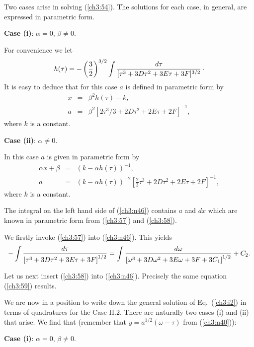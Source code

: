 Two cases arise in solving (\ref{ch3:54}). The solutions for each case, in general,
are expressed in parametric form.

{\bf Case (i)}: $\alpha=0$, $\beta\ne0$.

For convenience we let
\begin{equation}
h(\tau)=-\left({3\over2}\right)^{3/2}\int {d\tau\over[\tau^3+3D\tau^2+3E\tau+3F]^{3/2}}\,\cdot\label{ch3:56}
\end{equation}
It is easy to deduce that for this case $a$ is defined in parametric form by
\begin{equation} \label{ch3:57} 
\begin{array}{lll} x &=&
\beta^2h(\tau)-k,\\ 
a &=& \beta^2[2\tau^3/3+2D\tau^2+2E\tau+2F]^{-1}, 
\end{array} 
\end{equation}
where $k$ is  a constant. 

{\bf Case (ii)}: $\alpha\ne0$.

In this case $a$ is given in parametric form by
\begin{equation}\label{ch3:58}
\begin{array}{lll} \alpha x+\beta &= & (k-\alpha h(\tau))^{-1},\\
a&=&(k-\alpha h(\tau))^{-2}[\frac23\tau^3+2D\tau^2+2E\tau+2F]^{-1},
\end{array}
\end{equation}
where $k$ is a constant.

The integral on the left hand side of (\ref{ch3:n46}) contains $a$ and $dx$ which are known in parametric
form from (\ref{ch3:57}) and (\ref{ch3:58}).

We firstly invoke (\ref{ch3:57}) into (\ref{ch3:n46}). This yields
\begin{equation}
- \int {d\tau\over \left [\tau^3 +3D\tau^2+3E\tau+3F\right ]^{1/2}}= 
\int \frac{d\omega}{\left [ \omega^3
+3D\omega^2 +3E\omega+3F+3C_1\right]^{1/2}}+C_2.   \label{ch3:59}
\end{equation}

Let us next insert (\ref{ch3:58}) into (\ref{ch3:n46}). Precisely the same equation (\ref{ch3:59})
results.

We are now in a position to write down the general solution of Eq.\ (\ref{ch3:i2}) in terms of quadratures
for the Case II.2. There are naturally two cases (i) and (ii) that
arise. We find that (remember that $y=a^{1/2}(\omega-\tau)$ from (\ref{ch3:n40})):

{\bf Case (i)}: $\alpha=0$, $\beta\ne0$.

